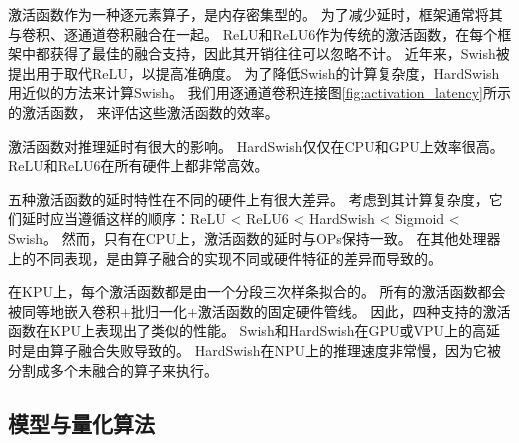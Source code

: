 
激活函数作为一种逐元素算子，是内存密集型的。
为了减少延时，框架通常将其与卷积、逐通道卷积融合在一起。
ReLU和ReLU6作为传统的激活函数，在每个框架中都获得了最佳的融合支持，因此其开销往往可以忽略不计。
近年来，Swish被提出用于取代ReLU，以提高准确度。
为了降低Swish的计算复杂度，HardSwish用近似的方法来计算Swish。
我们用逐通道卷积连接图\ref{fig:activation_latency}所示的激活函数，
来评估这些激活函数的效率。

\begin{finding}
    激活函数对推理延时有很大的影响。
    HardSwish仅仅在CPU和GPU上效率很高。
    ReLU和ReLU6在所有硬件上都非常高效。
\end{finding}

五种激活函数的延时特性在不同的硬件上有很大差异。
考虑到其计算复杂度，它们延时应当遵循这样的顺序：ReLU < ReLU6 < HardSwish < Sigmoid < Swish。
然而，只有在CPU上，激活函数的延时与OPs保持一致。
在其他处理器上的不同表现，是由算子融合的实现不同或硬件特征的差异而导致的。

在KPU上，每个激活函数都是由一个分段三次样条拟合的。
所有的激活函数都会被同等地嵌入卷积+批归一化+激活函数的固定硬件管线。
因此，四种支持的激活函数在KPU上表现出了类似的性能。
Swish和HardSwish在GPU或VPU上的高延时是由算子融合失败导致的。
HardSwish在NPU上的推理速度非常慢，因为它被分割成多个未融合的算子来执行。

\subsection{模型与量化算法}
\label{analysis:model quantization}